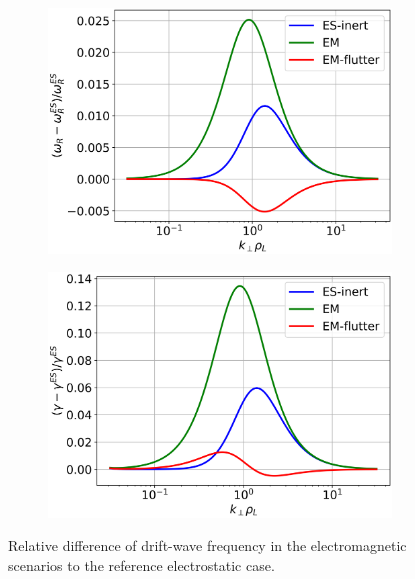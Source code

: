 \begin{figure}[H]
	\centering
	\begin{subfigure}[t]{0.45\textwidth}
		\centering
		\includegraphics[width=1\textwidth]{schemes/comparison_DW_real.png}
		\label{fig:anal_comparisonDWreal}
	\end{subfigure}
	\begin{subfigure}[t]{0.45\textwidth}
		\centering
		\includegraphics[width=1\textwidth]{schemes/comparison_DW_imag.png}
		\label{fig:anal_comparisonDWimag}
	\end{subfigure}
	\caption{Relative difference of drift-wave frequency in the electromagnetic scenarios to the reference electrostatic case.} 
	\label{fig:anal_comparisonDW}
\end{figure}

